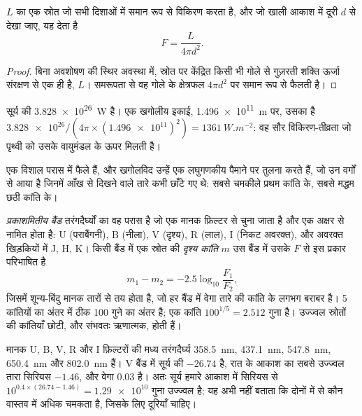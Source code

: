\begin{proposition}[व्युत्क्रम-वर्ग नियम]\label{prop:b1:observing-the-sky:inverse-square}
 $L$ का एक स्रोत जो सभी दिशाओं में समान रूप से विकिरण करता है, और जो खाली आकाश में दूरी
$d$ से देखा जाए, यह  देता है
\[
  F = \frac{L}{4\pi d^2} .
\]
\end{proposition}

\begin{proof}
बिना अवशोषण की स्थिर अवस्था में, स्रोत पर केंद्रित किसी भी गोले से गुज़रती शक्ति ऊर्जा संरक्षण से
एक ही है, $L$। समरूपता से वह गोले के क्षेत्रफल $4\pi d^2$ पर समान रूप से फैलती है।
\end{proof}

\begin{example}
सूर्य की  \qty{3.828e26}{W} है। एक खगोलीय इकाई, \qty{1.496e11}{m} पर, उसका  है
$\num{3.828e26}/(4\pi\times
(\num{1.496e11})^2) = \qty{1361}{W.m^{-2}}$: वह सौर विकिरण-तीव्रता जो पृथ्वी को उसके वायुमंडल
के ऊपर मिलती है।
\end{example}

 एक विशाल परास में फैले हैं, और खगोलविद उन्हें एक लघुगणकीय पैमाने पर तुलना करते हैं, जो
उन वर्गों से आया है जिनमें आँख से दिखने वाले तारे कभी छाँटे गए थे: सबसे चमकीले प्रथम कांति के,
सबसे मद्धम छठी कांति के।

\begin{definition}[दृश्य कांति, प्रकाशमितीय बैंड]\label{def:b1:observing-the-sky:magnitude}
\emph{प्रकाशमितीय बैंड} तरंगदैर्घ्यों का वह परास है जो एक मानक फ़िल्टर से चुना
जाता है और एक अक्षर से नामित होता है: U (पराबैंगनी), B (नीला), V (दृश्य), R (लाल), I (निकट अवरक्त),
और अवरक्त खिड़कियों में J, H, K। किसी बैंड में एक स्रोत की \emph{दृश्य कांति} $m$ उस
बैंड में उसके  $F$ से इस प्रकार परिभाषित है
\[
  m_1 - m_2 = -2.5\log_{10}\frac{F_1}{F_2} ,
\]
जिसमें शून्य-बिंदु मानक तारों से तय होता है, जो हर बैंड में वेगा तारे की कांति के लगभग बराबर है।
5 कांतियों का अंतर  में ठीक 100 गुने का अंतर है; एक कांति $100^{1/5} = 2.512$ गुना है।
उज्ज्वल स्रोतों की कांतियाँ छोटी, और संभवतः ऋणात्मक, होती हैं।
\end{definition}

मानक U, B, V, R और I फ़िल्टरों की मध्य तरंगदैर्घ्य \qty{358.5}{nm}, \qty{437.1}{nm}, \qty{547.8}{nm},
\qty{650.4}{nm} और \qty{802.0}{nm} हैं।
V बैंड में सूर्य की  $-26.74$ है, रात के आकाश का सबसे उज्ज्वल तारा सिरियस $-1.46$, और
वेगा $0.03$ है। अतः सूर्य हमारे आकाश में सिरियस से $10^{0.4\times(26.74 - 1.46)} = \num{1.29e10}$ गुना
उज्ज्वल है; यह अभी नहीं बताता कि दोनों में से कौन वास्तव में अधिक चमकता है, जिसके लिए दूरियाँ चाहिए।

